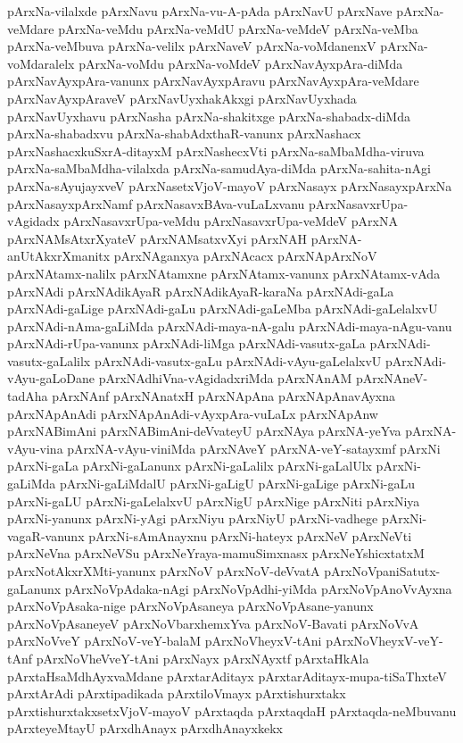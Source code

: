 {pArxNa-vilalxde
pArxNavu
pArxNa-vu-A-pAda
pArxNavU
pArxNave
pArxNa-veMdare
pArxNa-veMdu
pArxNa-veMdU
pArxNa-veMdeV
pArxNa-veMba
pArxNa-veMbuva
pArxNa-velilx
pArxNaveV
pArxNa-voMdanenxV
pArxNa-voMdaralelx
pArxNa-voMdu
pArxNa-voMdeV
pArxNavAyxpAra-diMda
pArxNavAyxpAra-vanunx
pArxNavAyxpAravu
pArxNavAyxpAra-veMdare
pArxNavAyxpAraveV
pArxNavUyxhakAkxgi
pArxNavUyxhada
pArxNavUyxhavu
pArxNasha
pArxNa-shakitxge
pArxNa-shabadx-diMda
pArxNa-shabadxvu
pArxNa-shabAdxthaR-vanunx
pArxNashacx
pArxNashacxkuSxrA-ditayxM
pArxNashecxVti
pArxNa-saMbaMdha-viruva
pArxNa-saMbaMdha-vilalxda
pArxNa-samudAya-diMda
pArxNa-sahita-nAgi
pArxNa-sAyujayxveV
pArxNasetxVjoV-mayoV
pArxNasayx
pArxNasayxpArxNa
pArxNasayxpArxNamf
pArxNasavxBAva-vuLaLxvanu
pArxNasavxrUpa-vAgidadx
pArxNasavxrUpa-veMdu
pArxNasavxrUpa-veMdeV
pArxNA
pArxNAMsAtxrXyateV
pArxNAMsatxvXyi
pArxNAH
pArxNA-anUtAkxrXmanitx
pArxNAganxya
pArxNAcacx
pArxNApArxNoV
pArxNAtamx-nalilx
pArxNAtamxne
pArxNAtamx-vanunx
pArxNAtamx-vAda
pArxNAdi
pArxNAdikAyaR
pArxNAdikAyaR-karaNa
pArxNAdi-gaLa
pArxNAdi-gaLige
pArxNAdi-gaLu
pArxNAdi-gaLeMba
pArxNAdi-gaLelalxvU
pArxNAdi-nAma-gaLiMda
pArxNAdi-maya-nA-galu
pArxNAdi-maya-nAgu-vanu
pArxNAdi-rUpa-vanunx
pArxNAdi-liMga
pArxNAdi-vasutx-gaLa
pArxNAdi-vasutx-gaLalilx
pArxNAdi-vasutx-gaLu
pArxNAdi-vAyu-gaLelalxvU
pArxNAdi-vAyu-gaLoDane
pArxNAdhiVna-vAgidadxriMda
pArxNAnAM
pArxNAneV-tadAha
pArxNAnf
pArxNAnatxH
pArxNApAna
pArxNApAnavAyxna
pArxNApAnAdi
pArxNApAnAdi-vAyxpAra-vuLaLx
pArxNApAnw
pArxNABimAni
pArxNABimAni-deVvateyU
pArxNAya
pArxNA-yeYva
pArxNA-vAyu-vina
pArxNA-vAyu-viniMda
pArxNAveY
pArxNA-veY-satayxmf
pArxNi
pArxNi-gaLa
pArxNi-gaLanunx
pArxNi-gaLalilx
pArxNi-gaLalUlx
pArxNi-gaLiMda
pArxNi-gaLiMdalU
pArxNi-gaLigU
pArxNi-gaLige
pArxNi-gaLu
pArxNi-gaLU
pArxNi-gaLelalxvU
pArxNigU
pArxNige
pArxNiti
pArxNiya
pArxNi-yanunx
pArxNi-yAgi
pArxNiyu
pArxNiyU
pArxNi-vadhege
pArxNi-vagaR-vanunx
pArxNi-sAmAnayxnu
pArxNi-hateyx
pArxNeV
pArxNeVti
pArxNeVna
pArxNeVSu
pArxNeYraya-mamuSimxnasx
pArxNeYshicxtatxM
pArxNotAkxrXMti-yanunx
pArxNoV
pArxNoV-deVvatA
pArxNoVpaniSatutx-gaLanunx
pArxNoVpAdaka-nAgi
pArxNoVpAdhi-yiMda
pArxNoVpAnoVvAyxna
pArxNoVpAsaka-nige
pArxNoVpAsaneya
pArxNoVpAsane-yanunx
pArxNoVpAsaneyeV
pArxNoVbarxhemxYva
pArxNoV-Bavati
pArxNoVvA
pArxNoVveY
pArxNoV-veY-balaM
pArxNoVheyxV-tAni
pArxNoVheyxV-veY-tAnf
pArxNoVheVveY-tAni
pArxNayx
pArxNAyxtf
pArxtaHkAla
pArxtaHsaMdhAyxvaMdane
pArxtarAditayx
pArxtarAditayx-mupa-tiSaThxteV
pArxtArAdi
pArxtipadikada
pArxtiloVmayx
pArxtishurxtakx
pArxtishurxtakxsetxVjoV-mayoV
pArxtaqda
pArxtaqdaH
pArxtaqda-neMbuvanu
pArxteyeMtayU
pArxdhAnayx
pArxdhAnayxkekx
}
